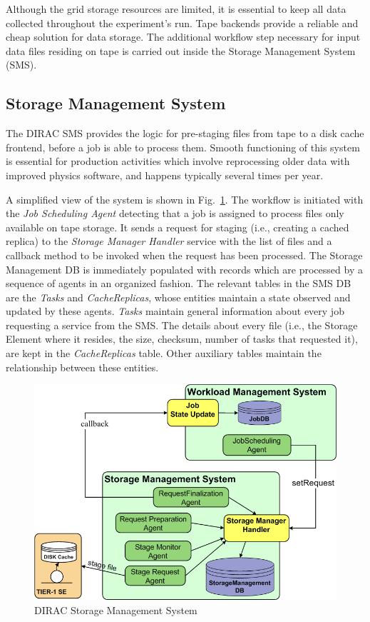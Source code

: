 \documentclass[10pt,conference]{IEEEtran}
\begin{document}
Although the grid storage resources are limited, it is essential to keep all
data collected throughout the experiment's run. Tape backends provide a reliable
and cheap solution for data storage. The additional workflow step 
necessary for input data files residing on tape is carried out inside the
Storage Management System (SMS).

\subsection{Storage Management System}

The DIRAC SMS provides the logic for pre-staging files from tape to a disk cache
frontend, before a job is able to process them. Smooth functioning of this
system is essential for production activities which involve reprocessing 
older data with improved physics software, and happens typically several times
per year.

A simplified view of the system is shown in  Fig.~\ref{fig:DIRAC-SMS}. The workflow is initiated
with the \textit{Job Scheduling Agent} detecting that a job is assigned to process files
only available on tape storage. It sends a request for staging (i.e., creating a
cached replica) to the \textit{Storage Manager Handler} service with the
list of files and a callback method to be invoked when the request has been
processed. The Storage Management DB is immediately populated with records which
are processed by a sequence of agents in an organized fashion. The relevant
tables in the SMS DB are the \textit{Tasks} and \textit{CacheReplicas}, whose
entities maintain a state observed and updated by these agents. \textit{Tasks} maintain
general information about every job requesting a service from the SMS. The
details about every file (i.e., the Storage Element where it resides, the
size, checksum, number of tasks that requested it), are kept in the \textit{CacheReplicas}
table. Other auxiliary tables maintain the relationship between these entities.
\begin{figure}[t]
\begin{center}
 \includegraphics[width=0.9\linewidth,keepaspectratio=true]{./SMS_simplified.png}
\end{center}
\caption{DIRAC Storage Management System}
\vspace{-15 pt}
\label{fig:DIRAC-SMS}
\end{figure}
\end{document}
